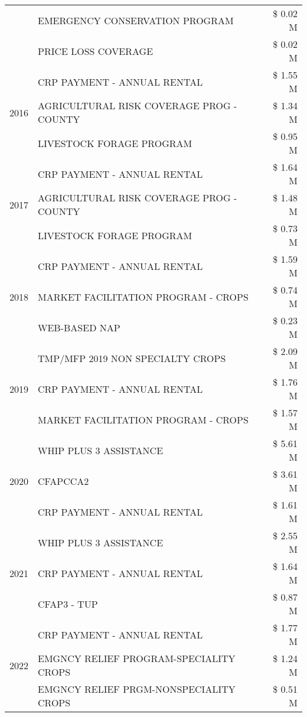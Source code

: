 \begin{tabular}{llr}
 & EMERGENCY CONSERVATION PROGRAM & \$ 0.02 M \\
 & PRICE LOSS COVERAGE & \$ 0.02 M \\
\cline{1-3}
\multirow[t]{3}{*}{2016} & CRP PAYMENT - ANNUAL RENTAL & \$ 1.55 M \\
 & AGRICULTURAL RISK COVERAGE PROG - COUNTY & \$ 1.34 M \\
 & LIVESTOCK FORAGE PROGRAM & \$ 0.95 M \\
\cline{1-3}
\multirow[t]{3}{*}{2017} & CRP PAYMENT - ANNUAL RENTAL & \$ 1.64 M \\
 & AGRICULTURAL RISK COVERAGE PROG - COUNTY & \$ 1.48 M \\
 & LIVESTOCK FORAGE PROGRAM & \$ 0.73 M \\
\cline{1-3}
\multirow[t]{3}{*}{2018} & CRP PAYMENT - ANNUAL RENTAL & \$ 1.59 M \\
 & MARKET FACILITATION PROGRAM - CROPS & \$ 0.74 M \\
 & WEB-BASED NAP & \$ 0.23 M \\
\cline{1-3}
\multirow[t]{3}{*}{2019} & TMP/MFP 2019 NON SPECIALTY CROPS & \$ 2.09 M \\
 & CRP PAYMENT - ANNUAL RENTAL & \$ 1.76 M \\
 & MARKET FACILITATION PROGRAM - CROPS & \$ 1.57 M \\
\cline{1-3}
\multirow[t]{3}{*}{2020} & WHIP PLUS 3 ASSISTANCE & \$ 5.61 M \\
 & CFAPCCA2 & \$ 3.61 M \\
 & CRP PAYMENT - ANNUAL RENTAL & \$ 1.61 M \\
\cline{1-3}
\multirow[t]{3}{*}{2021} & WHIP PLUS 3 ASSISTANCE & \$ 2.55 M \\
 & CRP PAYMENT - ANNUAL RENTAL & \$ 1.64 M \\
 & CFAP3 - TUP & \$ 0.87 M \\
\cline{1-3}
\multirow[t]{3}{*}{2022} & CRP PAYMENT - ANNUAL RENTAL & \$ 1.77 M \\
 & EMGNCY RELIEF PROGRAM-SPECIALITY CROPS & \$ 1.24 M \\
 & EMGNCY RELIEF PRGM-NONSPECIALITY CROPS & \$ 0.51 M \\
\cline{1-3}
\bottomrule
\end{tabular}
